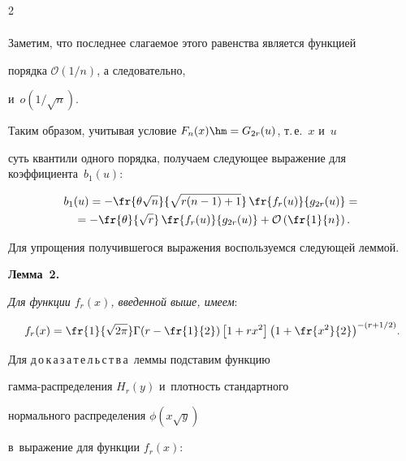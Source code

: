 \begin{multicols}{2}
\begin{multline*}
\end{multline*}

Заметим, что последнее слагаемое этого равенства является функцией 

порядка  $\mathcal{O}\left(1/n\right)$, а следовательно, 

и~$o\left(1/\sqrt{n}\right)$.



Таким образом, учитывая условие $F_n(x)\hm=G_{2r}(u)$, т.\,е.~$x$ и~$u$ 

суть квантили одного порядка, получаем следующее выражение для коэффициента~$b_1(u)$:

\begin{multline*}

 b_1(u)  =-\fr{\theta \sqrt{n}}{\sqrt{r(n-1)+1}}\,\fr{f_r(u)}{g_{2r}(u)}

     ={}\\

     {}= -\fr{\theta}{\sqrt{r}}\,\fr{f_r(u)}{g_{2r}(u)}+

     \mathcal{O}\left(\fr{1}{n}\right).

\end{multline*}

Для упрощения получившегося выражения воспользуемся следующей леммой.



\smallskip



\noindent

\textbf{Лемма~2.}\

\textit{Для функции $f_r(x)$, введенной выше, имеем}:

$$ 

f_r(x)=\fr{1}{\sqrt{2\pi}}\Gamma\!\left(r-\fr{1}{2}\right) \left[ 

1+rx^{2}\right] \left(1+\fr{x^{2}}{2} \right)^{-\left( r+1/2 \right)}\! .

$$







Для д\,о\,к\,а\,з\,а\,т\,е\,л\,ь\,с\,т\,в\,а\ леммы подставим функцию 

гам\-ма-рас\-пре\-\-\-деления $H_r (y)$ и~плотность стандартного 

нормального распределения  $\phi\left(x\sqrt{y}\right)$ 

в~выражение для функции $f_r(x)$:

\begin{multline*}


\end{multline*}
\end{multicols}
